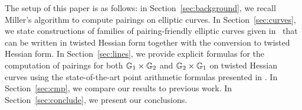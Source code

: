 The setup of this paper is as follows:
in Section~\ref{sec:background}, we recall Miller's algorithm to compute pairings on elliptic curves.
In Section~\ref{sec:curves}, we state constructions of families of pairing-friendly elliptic curves given in~\cite{2010/freeman}
that can be written in twisted Hessian form together with the conversion
to twisted Hessian form.
In Section~\ref{sec:lines}, we provide explicit formulas for the computation of 
pairings for both $\mathbb{G}_{1} \times \mathbb{G}_{2}$ and $\mathbb{G}_{2} \times \mathbb{G}_{1}$ 
on twisted Hessian curves
using the state-of-the-art point arithmetic formulas presented in \cite{2015/hessian}.
In Section~\ref{sec:cmp}, we compare our results to previous work.
In Section~\ref{sec:conclude}, we present our conclusions.


